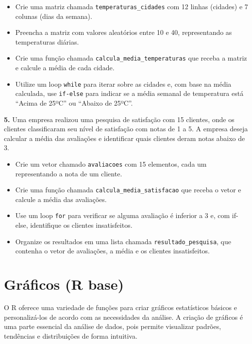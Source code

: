 \documentclass[
]{book}
\providecommand{\tightlist}{%
  \setlength{\itemsep}{0pt}\setlength{\parskip}{0pt}}
\begin{document}
\begin{itemize}
\tightlist
\item
  Crie uma matriz chamada \texttt{temperaturas\_cidades} com 12 linhas (cidades) e 7 colunas (dias da semana).
\item
  Preencha a matriz com valores aleatórios entre 10 e 40, representando as temperaturas diárias.
\item
  Crie uma função chamada \texttt{calcula\_media\_temperaturas} que receba a matriz e calcule a média de cada cidade.
\item
  Utilize um loop \texttt{while} para iterar sobre as cidades e, com base na média calculada, use \texttt{if-else} para indicar se a média semanal de temperatura está ``Acima de 25ºC'' ou ``Abaixo de 25ºC''.
\end{itemize}

\textbf{5.} Uma empresa realizou uma pesquisa de satisfação com 15 clientes, onde os clientes classificaram seu nível de satisfação com notas de 1 a 5. A empresa deseja calcular a média das avaliações e identificar quais clientes deram notas abaixo de 3.

\begin{itemize}
\tightlist
\item
  Crie um vetor chamado \texttt{avaliacoes} com 15 elementos, cada um representando a nota de um cliente.
\item
  Crie uma função chamada \texttt{calcula\_media\_satisfacao} que receba o vetor e calcule a média das avaliações.
\item
  Use um loop \texttt{for} para verificar se alguma avaliação é inferior a 3 e, com if-else, identifique os clientes insatisfeitos.
\item
  Organize os resultados em uma lista chamada \texttt{resultado\_pesquisa}, que contenha o vetor de avaliações, a média e os clientes insatisfeitos.
\end{itemize}

\chapter{Gráficos (R base)}\label{gruxe1ficos-r-base}

O R oferece uma variedade de funções para criar gráficos
estatísticos básicos e personalizá-los de acordo com as necessidades da
análise. A criação de gráficos é uma parte essencial da análise de
dados, pois permite visualizar padrões, tendências e distribuições de
forma intuitiva.
\end{document}

